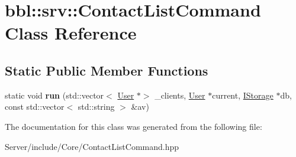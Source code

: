 \hypertarget{classbbl_1_1srv_1_1_contact_list_command}{}\section{bbl\+:\+:srv\+:\+:Contact\+List\+Command Class Reference}
\label{classbbl_1_1srv_1_1_contact_list_command}
\subsection*{Static Public Member Functions}
\begin{DoxyCompactItemize}
\item 
\mbox{\label{classbbl_1_1srv_1_1_contact_list_command_a4e7abf48164a6b1d3c294ddb17eb8618}} 
static void {\bfseries run} (std\+::vector$<$ \hyperlink{classbbl_1_1srv_1_1_user}{User} $\ast$$>$ \+\_\+clients, \hyperlink{classbbl_1_1srv_1_1_user}{User} $\ast$current, \hyperlink{classbbl_1_1srv_1_1_i_storage}{I\+Storage} $\ast$db, const std\+::vector$<$ std\+::string $>$ \&av)
\end{DoxyCompactItemize}


The documentation for this class was generated from the following file\+:\begin{DoxyCompactItemize}
\item 
Server/include/\+Core/Contact\+List\+Command.\+hpp\end{DoxyCompactItemize}
